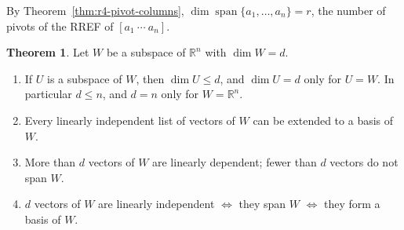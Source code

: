 \documentclass[12pt]{article}
\newcommand{\R}{\mathbb R}
\DeclareMathOperator{\Span}{span}
\theoremstyle{definition}
\newtheorem{theorem}{Theorem}
\begin{document}
By Theorem~\ref{thm:r4-pivot-columns}, \(\dim\Span\{a_1,\dots,a_n\}=r\), the number of pivots of
the RREF of \([a_1\ \cdots\ a_n]\).

\begin{theorem}\label{thm:r4-counting}
Let \(W\) be a subspace of \(\R^n\) with \(\dim W=d\).
\begin{enumerate}
\item If \(U\) is a subspace of \(W\), then \(\dim U\leqslant d\), and \(\dim U=d\) only for
\(U=W\). In particular \(d\leqslant n\), and \(d=n\) only for \(W=\R^n\).
\item Every linearly independent list of vectors of \(W\) can be extended to a basis of \(W\).
\item More than \(d\) vectors of \(W\) are linearly dependent; fewer than \(d\) vectors do not span
\(W\).
\item \(d\) vectors of \(W\) are linearly independent \(\Leftrightarrow\) they span \(W\)
\(\Leftrightarrow\) they form a basis of \(W\).
\end{enumerate}
\end{theorem}
\end{document}
